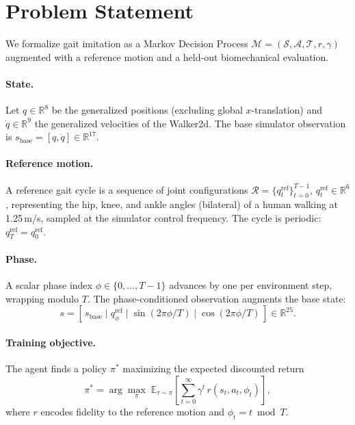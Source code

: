 \documentclass{article}
\begin{document}
\section{Problem Statement}

We formalize gait imitation as a Markov Decision Process $\mathcal{M} = (\mathcal{S}, \mathcal{A}, \mathcal{T}, r, \gamma)$ augmented with a reference motion and a held-out biomechanical evaluation.

\paragraph{State.} Let $q \in \mathbb{R}^{8}$ be the generalized positions (excluding global $x$-translation) and $\dot q \in \mathbb{R}^{9}$ the generalized velocities of the Walker2d. The base simulator observation is $s_{\text{base}} = [q, \dot q] \in \mathbb{R}^{17}$.

\paragraph{Reference motion.} A reference gait cycle is a sequence of joint configurations $\mathcal{R} = \{q^{\text{ref}}_t\}_{t=0}^{T-1}$, $q^{\text{ref}}_t \in \mathbb{R}^{6}$, representing the hip, knee, and ankle angles (bilateral) of a human walking at 1.25\,m/s, sampled at the simulator control frequency. The cycle is periodic: $q^{\text{ref}}_T = q^{\text{ref}}_0$.

\paragraph{Phase.} A scalar phase index $\phi \in \{0, \ldots, T-1\}$ advances by one per environment step, wrapping modulo $T$. The phase-conditioned observation augments the base state:
\[
s = [\, s_{\text{base}} \mid q^{\text{ref}}_\phi \mid \sin(2\pi\phi/T) \mid \cos(2\pi\phi/T) \,] \in \mathbb{R}^{25}.
\]

\paragraph{Training objective.} The agent finds a policy $\pi^*$ maximizing the expected discounted return
\[
\pi^* = \arg\max_\pi \; \mathbb{E}_{\tau \sim \pi}\!\left[\sum_{t=0}^{\infty} \gamma^t\, r(s_t, a_t, \phi_t) \right],
\]
where $r$ encodes fidelity to the reference motion and $\phi_t = t \bmod T$.
\end{document}
